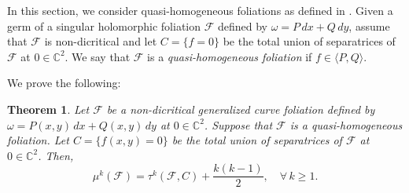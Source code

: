 \documentclass[12pt,letterpaper]{amsart}
\newcommand{\C}{\mathbb{C}}
\newcommand{\F}{\mathcal{F}}
\newtheorem{theorem}{Theorem}[section]
\begin{document}
In this section, we consider quasi-homogeneous foliations as defined in \cite[p.~178]{David}. Given a germ of a singular holomorphic foliation $\F$ defined by $\omega = P\,dx + Q\,dy$, assume that $\F$ is non-dicritical and let $C = \{ f = 0 \}$ be the total union of separatrices of $\F$ at $0 \in \C^2$.  We say that $\F$ is a \emph{quasi-homogeneous foliation} if $f \in \langle P, Q \rangle$.

\par We prove the following:
\begin{theorem}
Let $\mathcal{F}$ be a non-dicritical generalized curve foliation defined by $\omega = P(x,y)\,dx + Q(x,y)\,dy$ at $0\in\C^2$. Suppose that $\F$ is a quasi-homogeneous foliation. Let \( C = \{f(x,y) = 0\} \) be the total union of separatrices of $\F$ at $0\in\C^2$. Then,  
\[
    \mu^{k}(\mathcal{F}) = \tau^{k}(\mathcal{F},C) + \frac{k(k-1)}{2},\quad \forall\, k\geq 1.
\]
\end{theorem} 
\end{document}
